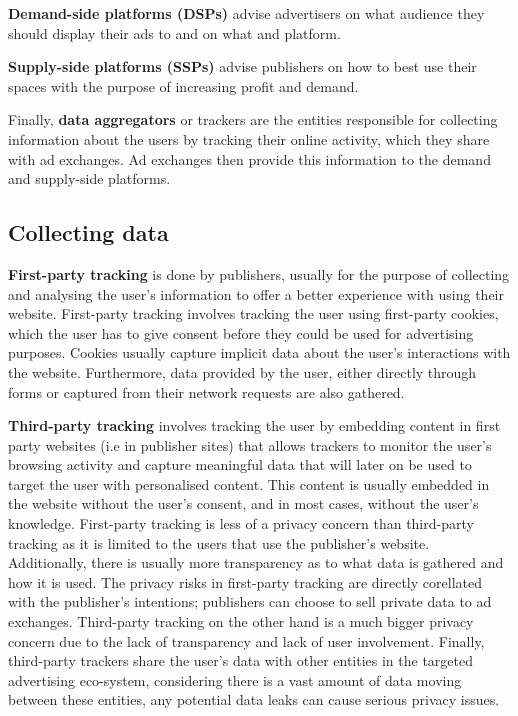 \documentclass{l4proj}
\begin{document}
\textbf{Demand-side platforms (DSPs)} advise advertisers on what audience they should display their ads to and on what and platform. 

\textbf{Supply-side platforms (SSPs)} advise publishers on how to best use their spaces with the purpose of increasing profit and demand. 

Finally, \textbf{data aggregators} or trackers are the entities responsible for collecting information about the users by tracking their online activity, which they share with ad exchanges. Ad exchanges then provide this information to the demand and supply-side platforms.

\subsection{Collecting data}
\textbf{First-party tracking} is done by publishers, usually for the purpose of collecting and analysing the user's information to offer a better experience with using their website. First-party tracking involves tracking the user using first-party cookies, which the user has to give consent before they could be used for advertising purposes. Cookies usually capture implicit data about the user's interactions with the website. Furthermore, data provided by the user, either directly through forms or captured from their network requests are also gathered.

\textbf{Third-party tracking} involves tracking the user by embedding content in first party websites (i.e in publisher sites) that allows trackers to monitor the user's browsing activity and capture meaningful data that will later on be used to target the user with personalised content. This content is usually embedded in the website without the user's consent, and in most cases, without the user's knowledge.
First-party tracking is less of a privacy concern than third-party tracking as it is limited to the users that use the publisher's website. Additionally, there is usually more transparency as to what data is gathered and how it is used. The privacy risks in first-party tracking are directly corellated with the publisher's intentions; publishers can choose to sell private data to ad exchanges. Third-party tracking on the other hand is a much bigger privacy concern due to the lack of transparency and lack of user involvement. Finally, third-party trackers share the user's data with other entities in the targeted advertising eco-system, considering there is a vast amount of data moving between these entities, any potential data leaks can cause serious privacy issues. 
\end{document}
